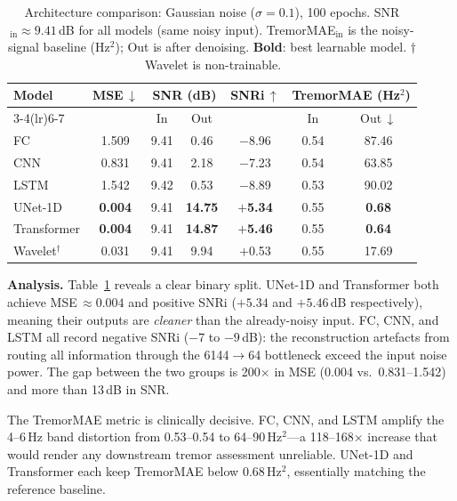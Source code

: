 \documentclass{article}
\begin{document}
\begin{table}[ht]
\caption{Architecture comparison: Gaussian noise ($\sigma=0.1$), 100 epochs.
SNR$_\text{in}\approx9.41$\,dB for all models (same noisy input).
TremorMAE$_\text{in}$ is the noisy-signal baseline (Hz$^2$); Out is after
denoising. \textbf{Bold}: best learnable model.
$\dagger$\,Wavelet is non-trainable.}
\label{tab:arch-results}
\begin{center}
\begin{tabular}{lcccccc}
\toprule
\multirow{2}{*}{\textbf{Model}} &
\multirow{2}{*}{\textbf{MSE\,$\downarrow$}} &
\multicolumn{2}{c}{\textbf{SNR (dB)}} &
\multirow{2}{*}{\textbf{SNRi\,$\uparrow$}} &
\multicolumn{2}{c}{\textbf{TremorMAE (Hz$^2$)}} \\
\cmidrule(lr){3-4}\cmidrule(lr){6-7}
& & In & Out & & In & Out\,$\downarrow$ \\
\midrule
FC          & 1.509 & 9.41 & \phantom{$+$}0.46 & $-$8.96 & 0.54 & \phantom{0}87.46 \\
CNN         & 0.831 & 9.41 & \phantom{$+$}2.18 & $-$7.23 & 0.54 & \phantom{0}63.85 \\
LSTM        & 1.542 & 9.42 & \phantom{$+$}0.53 & $-$8.89 & 0.53 & \phantom{0}90.02 \\
UNet-1D     & \textbf{0.004} & 9.41 & \textbf{14.75} & $+$\textbf{5.34} & 0.55 & \phantom{00}\textbf{0.68} \\
Transformer & \textbf{0.004} & 9.41 & \textbf{14.87} & $+$\textbf{5.46} & 0.55 & \phantom{00}\textbf{0.64} \\
\midrule
Wavelet$^\dagger$ & 0.031 & 9.41 & \phantom{$+$}9.94 & $+$0.53 & 0.55 & \phantom{0}17.69 \\
\bottomrule
\end{tabular}
\end{center}
\end{table}

\textbf{Analysis.}
Table~\ref{tab:arch-results} reveals a clear binary split.
UNet-1D and Transformer both achieve MSE\,$\approx 0.004$ and positive
SNRi ($+5.34$ and $+5.46$\,dB respectively), meaning their outputs are
\emph{cleaner} than the already-noisy input.
FC, CNN, and LSTM all record negative SNRi ($-7$ to $-9$\,dB): the
reconstruction artefacts from routing all information through the
6144$\to$64 bottleneck exceed the input noise power.
The gap between the two groups is 200$\times$ in MSE
(0.004 vs.\ 0.831--1.542) and more than 13\,dB in SNR.

The TremorMAE metric is clinically decisive.
FC, CNN, and LSTM amplify the 4--6\,Hz band distortion from 0.53--0.54 to
64--90\,Hz$^2$---a 118--168$\times$ increase that would render any downstream
tremor assessment unreliable.
UNet-1D and Transformer each keep TremorMAE below 0.68\,Hz$^2$, essentially
matching the reference baseline.
\end{document}
